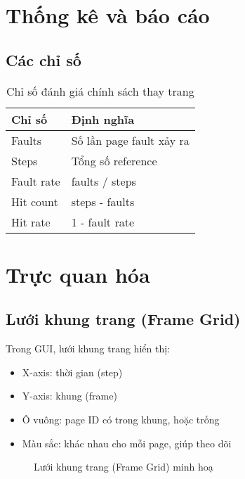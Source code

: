 \section{Thống kê và báo cáo}

\subsection{Các chỉ số}

\begin{table}[H]
\centering
\caption{Chỉ số đánh giá chính sách thay trang}
\begin{tabular}{ll}
\toprule
\textbf{Chỉ số} & \textbf{Định nghĩa} \\
\midrule
Faults & Số lần page fault xảy ra \\
Steps & Tổng số reference \\
Fault rate & faults / steps \\
Hit count & steps - faults \\
Hit rate & 1 - fault rate \\
\bottomrule
\end{tabular}
\end{table}

\section{Trực quan hóa}

\subsection{Lưới khung trang (Frame Grid)}

Trong GUI, lưới khung trang hiển thị:
\begin{itemize}[leftmargin=1.5cm]
  \item X-axis: thời gian (step)
  \item Y-axis: khung (frame)
  \item Ô vuông: page ID có trong khung, hoặc trống
  \item Màu sắc: khác nhau cho mỗi page, giúp theo dõi
\end{itemize}

\begin{figure}[H]
\centering
{}
\caption{Lưới khung trang (Frame Grid) minh hoạ}
\label{fig:frame_grid}
\end{figure}

\clearpage
